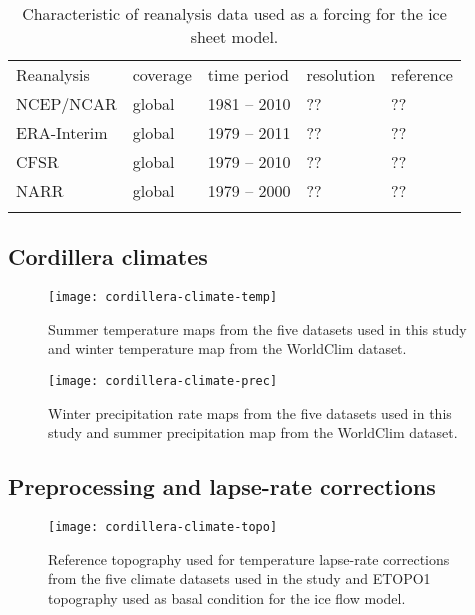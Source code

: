 \begin{table}[t]
	\caption{Characteristic of reanalysis data used as a forcing for the ice sheet model.}
	\label{tab:reanalyses}
	\vskip4mm
	\centering
	\begin{tabular}{lllll}
		\tophline
		Reanalysis& coverage& time period&  resolution& reference\\
		\middlehline
		NCEP/NCAR&  global&   1981 -- 2010& ??& ??\\
		ERA-Interim&global&   1979 -- 2011& ??& ??\\
		CFSR&       global&   1979 -- 2010& ??& ??\\
		NARR&       global&   1979 -- 2000& ??& ??\\
		\bottomhline
	\end{tabular}
\end{table}


\subsection{Cordillera climates}

\begin{figure}[t]
	\vspace*{2mm}
	\begin{center}
		\texttt{[image: cordillera-climate-temp]}
	\end{center}
	\caption{Summer temperature maps from the five datasets used in this study and winter temperature map from the WorldClim dataset.}
	\label{fig:temp}
\end{figure}

\begin{figure}[t]
	\vspace*{2mm}
	\begin{center}
		\texttt{[image: cordillera-climate-prec]}
	\end{center}
	\caption{Winter precipitation rate maps from the five datasets used in this study and summer precipitation map from the WorldClim dataset.}
	\label{fig:prec}
\end{figure}


\subsection{Preprocessing and lapse-rate corrections}

\begin{figure}[t]
	\vspace*{2mm}
	\begin{center}
		\texttt{[image: cordillera-climate-topo]}
	\end{center}
	\caption{Reference topography used for temperature lapse-rate corrections from the five climate datasets used in the study and ETOPO1 topography used as basal condition for the ice flow model.}
	\label{fig:topo}
\end{figure}

